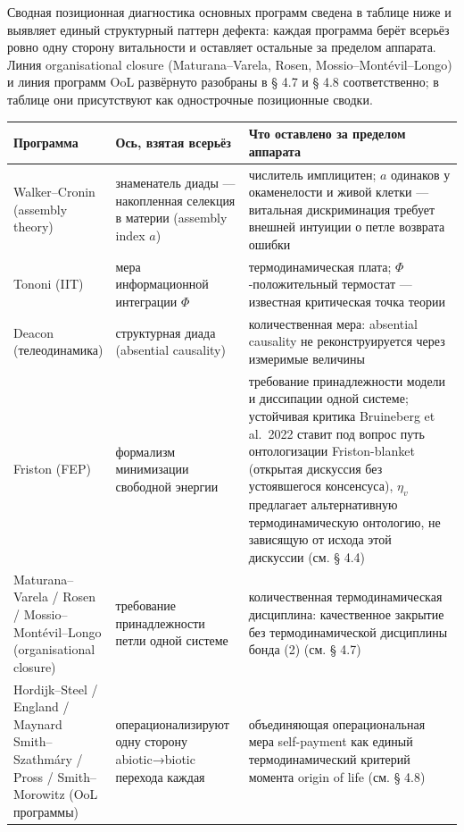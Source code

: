 \documentclass[pdflatex,sn-mathphys-ay]{sn-jnl}
\begin{document}
Сводная позиционная диагностика основных программ сведена в таблице ниже и выявляет единый структурный паттерн дефекта: каждая программа берёт всерьёз ровно одну сторону витальности и оставляет остальные за пределом аппарата. Линия organisational closure (Maturana--Varela, Rosen, Mossio--Montévil--Longo) и линия программ OoL развёрнуто разобраны в § 4.7 и § 4.8 соответственно; в таблице они присутствуют как однострочные позиционные сводки.

\begin{center}\small
\begin{tabular}{@{} >{\raggedright\arraybackslash}p{0.1594\linewidth} >{\raggedright\arraybackslash}p{0.3043\linewidth} >{\raggedright\arraybackslash}p{0.5362\linewidth}@{}}
\toprule
\begin{minipage}[b]{\linewidth}\raggedright
Программа
\end{minipage} & \begin{minipage}[b]{\linewidth}\raggedright
Ось, взятая всерьёз
\end{minipage} & \begin{minipage}[b]{\linewidth}\raggedright
Что оставлено за пределом аппарата
\end{minipage} \\
\midrule
Walker--Cronin (assembly theory) & знаменатель диады --- накопленная селекция в материи (assembly index \(a\)) & числитель имплицитен; \(a\) одинаков у окаменелости и живой клетки --- витальная дискриминация требует внешней интуиции о петле возврата ошибки \\
Tononi (IIT) & мера информационной интеграции \(\Phi\) & термодинамическая плата; \(\Phi\)-положительный термостат --- известная критическая точка теории \\
Deacon (телеодинамика) & структурная диада (absential causality) & количественная мера: absential causality не реконструируется через измеримые величины \\
Friston (FEP) & формализм минимизации свободной энергии & требование принадлежности модели и диссипации одной системе; устойчивая критика Bruineberg et al.~2022 ставит под вопрос путь онтологизации Friston-blanket (открытая дискуссия без устоявшегося консенсуса), \(\eta_v\) предлагает альтернативную термодинамическую онтологию, не зависящую от исхода этой дискуссии (см. § 4.4) \\
Maturana--Varela / Rosen / Mossio--Montévil--Longo (organisational closure) & требование принадлежности петли одной системе & количественная термодинамическая дисциплина: качественное закрытие без термодинамической дисциплины бонда (2) (см. § 4.7) \\
Hordijk--Steel / England / Maynard Smith--Szathmáry / Pross / Smith--Morowitz (OoL программы) & операционализируют одну сторону abiotic→biotic перехода каждая & объединяющая операциональная мера self-payment как единый термодинамический критерий момента origin of life (см. § 4.8) \\
\bottomrule
\end{tabular}
\end{center}
\end{document}
